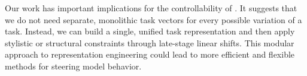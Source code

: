 Our work has important implications for the controllability of \fvsabbr. It suggests that we do not need separate, monolithic task vectors for every possible variation of a task. Instead, we can build a single, unified task representation and then apply stylistic or structural constraints through late-stage linear shifts. This modular approach to representation engineering could lead to more efficient and flexible methods for steering model behavior.
